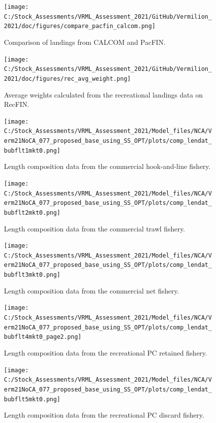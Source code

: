 \documentclass[
  english,
  a4paper,
]{article}
\begin{document}
\begin{figure}
\centering
\texttt{[image: C:/Stock\_Assessments/VRML\_Assessment\_2021/GitHub/Vermilion\_2021/doc/figures/compare\_pacfin\_calcom.png]}
\caption{Comparison of landings from CALCOM and PacFIN.\label{fig:calcom-pacfin}}
\end{figure}

\begin{figure}
\centering
\texttt{[image: C:/Stock\_Assessments/VRML\_Assessment\_2021/GitHub/Vermilion\_2021/doc/figures/rec\_avg\_weight.png]}
\caption{Average weights calculated from the recreational landings data on RecFIN.\label{fig:rec-avg-weights}}
\end{figure}

\begin{figure}
\centering
\texttt{[image: C:/Stock\_Assessments/VRML\_Assessment\_2021/Model\_files/NCA/Verm21NoCA\_077\_proposed\_base\_using\_SS\_OPT/plots/comp\_lendat\_bubflt1mkt0.png]}
\caption{Length composition data from the commercial hook-and-line fishery.\label{fig:len-data-COM-HKL}}
\end{figure}

\begin{figure}
\centering
\texttt{[image: C:/Stock\_Assessments/VRML\_Assessment\_2021/Model\_files/NCA/Verm21NoCA\_077\_proposed\_base\_using\_SS\_OPT/plots/comp\_lendat\_bubflt2mkt0.png]}
\caption{Length composition data from the commercial trawl fishery.\label{fig:len-data-COM-TWL}}
\end{figure}

\begin{figure}
\centering
\texttt{[image: C:/Stock\_Assessments/VRML\_Assessment\_2021/Model\_files/NCA/Verm21NoCA\_077\_proposed\_base\_using\_SS\_OPT/plots/comp\_lendat\_bubflt3mkt0.png]}
\caption{Length composition data from the commercial net fishery.\label{fig:len-data-COM-NET}}
\end{figure}

\begin{figure}
\centering
\texttt{[image: C:/Stock\_Assessments/VRML\_Assessment\_2021/Model\_files/NCA/Verm21NoCA\_077\_proposed\_base\_using\_SS\_OPT/plots/comp\_lendat\_bubflt4mkt0\_page2.png]}
\caption{Length composition data from the recreational PC retained fishery.\label{fig:len-data-REC-PC}}
\end{figure}

\begin{figure}
\centering
\texttt{[image: C:/Stock\_Assessments/VRML\_Assessment\_2021/Model\_files/NCA/Verm21NoCA\_077\_proposed\_base\_using\_SS\_OPT/plots/comp\_lendat\_bubflt5mkt0.png]}
\caption{Length composition data from the recreational PC discard fishery.\label{fig:len-data-REC-PC-DIS}}
\end{figure}
\end{document}
